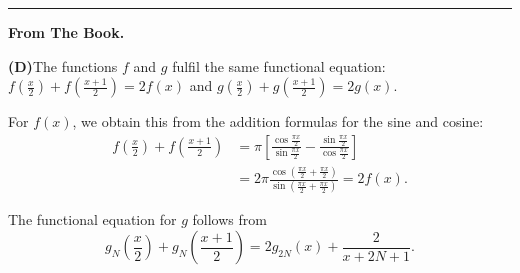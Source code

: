 \documentclass[letterpaper,landscape,KOMA,smallheadings,calcdimensions,display]{powersem}
\let\underl\textbf
\newenvironment{slide}{\raggedright}{}
\newenvironment{presentbox}{\par\begin{minipage}[t]{\linewidth}}{\end{minipage}\par}
\begin{document}
\begin{slide}
\ifthenelse{\isundefined{\align}}{}
{%
\medskip

\hrule
  
\begin{minipage}{\linewidth}
  \underl{From The Book.}
  \begin{presentbox}
    \setlength{\abovedisplayskip}{.3\abovedisplayskip}%
    \textbf{(D)}\quad The functions $f$ and $g$ fulfil the same functional equation:
    $f\left(\frac{x}{2}\right)+f\left(\frac{x+1}{2}\right)=2f(x)$ and
    $g\left(\frac{x}{2}\right)+g\left(\frac{x+1}{2}\right)=2g(x)$. 
    
    For $f(x)$, we obtain this from the addition formulas for the sine and cosine:
    \begin{align*}
      f\left(\textstyle\frac{x}{2}\right)+f\left(\textstyle\frac{x+1}{2}\right)
      &=\pi
      \left[\frac{\cos\frac{\pi x}{2}}{\sin\frac{\pi x}{2}}-\frac{\sin\frac{\pi x}{2}}{\cos\frac{\pi x}{2}}\right]
      \\[1ex]
      &=2\pi\frac{\cos\left(\frac{\pi x}{2}+\frac{\pi x}{2}\right)}{\sin\left(\frac{\pi x}{2}+\frac{\pi x}{2}\right)}
      =2f(x)\text{.}
    \end{align*}
    
    The functional equation for $g$ follows from
    \begin{displaymath}
      g_N\left(\textstyle\frac{x}{2}\right)+g_N\left(\textstyle\frac{x+1}{2}\right)
      =2g_{2N}(x)+\frac{2}{x+2N+1}\text{.}
    \end{displaymath}
  \end{presentbox}
\end{minipage}%
}

{%
\newpage
  
}
\end{slide}
\end{document}
